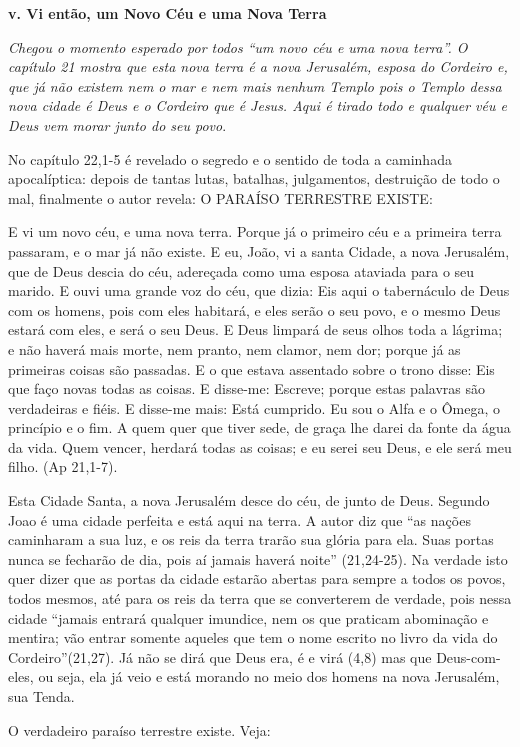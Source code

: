 \documentclass[
]{book}
\begin{document}
\textbf{v. Vi então, um Novo Céu e uma Nova Terra}

\emph{Chegou o momento esperado por todos ``um novo céu e uma nova terra''. O capítulo 21 mostra que esta nova terra é a nova Jerusalém, esposa do Cordeiro e, que já não existem nem o mar e nem mais nenhum Templo pois o Templo dessa nova cidade é Deus e o Cordeiro que é Jesus. Aqui é tirado todo e qualquer véu e Deus vem morar junto do seu povo}.

No capítulo 22,1-5 é revelado o segredo e o sentido de toda a caminhada apocalíptica: depois de tantas lutas, batalhas, julgamentos, destruição de todo o mal, finalmente o autor revela: O PARAÍSO TERRESTRE EXISTE:

E vi um novo céu, e uma nova terra. Porque já o primeiro céu e a primeira terra passaram, e o mar já não existe. E eu, João, vi a santa Cidade, a nova Jerusalém, que de Deus descia do céu, adereçada como uma esposa ataviada para o seu marido. E ouvi uma grande voz do céu, que dizia: Eis aqui o tabernáculo de Deus com os homens, pois com eles habitará, e eles serão o seu povo, e o mesmo Deus estará com eles, e será o seu Deus. E Deus limpará de seus olhos toda a lágrima; e não haverá mais morte, nem pranto, nem clamor, nem dor; porque já as primeiras coisas são passadas. E o que estava assentado sobre o trono disse: Eis que faço novas todas as coisas. E disse-me: Escreve; porque estas palavras são verdadeiras e fiéis. E disse-me mais: Está cumprido. Eu sou o Alfa e o Ômega, o princípio e o fim. A quem quer que tiver sede, de graça lhe darei da fonte da água da vida. Quem vencer, herdará todas as coisas; e eu serei seu Deus, e ele será meu filho. (Ap 21,1-7).

Esta Cidade Santa, a nova Jerusalém desce do céu, de junto de Deus. Segundo Joao é uma cidade perfeita e está aqui na terra. A autor diz que ``as nações caminharam a sua luz, e os reis da terra trarão sua glória para ela. Suas portas nunca se fecharão de dia, pois aí jamais haverá noite'' (21,24-25). Na verdade isto quer dizer que as portas da cidade estarão abertas para sempre a todos os povos, todos mesmos, até para os reis da terra que se converterem de verdade, pois nessa cidade ``jamais entrará qualquer imundice, nem os que praticam abominação e mentira; vão entrar somente aqueles que tem o nome escrito no livro da vida do Cordeiro''(21,27). Já não se dirá que Deus era, é e virá (4,8) mas que Deus-com-eles, ou seja, ela já veio e está morando no meio dos homens na nova Jerusalém, sua Tenda.

O verdadeiro paraíso terrestre existe. Veja:
\end{document}
